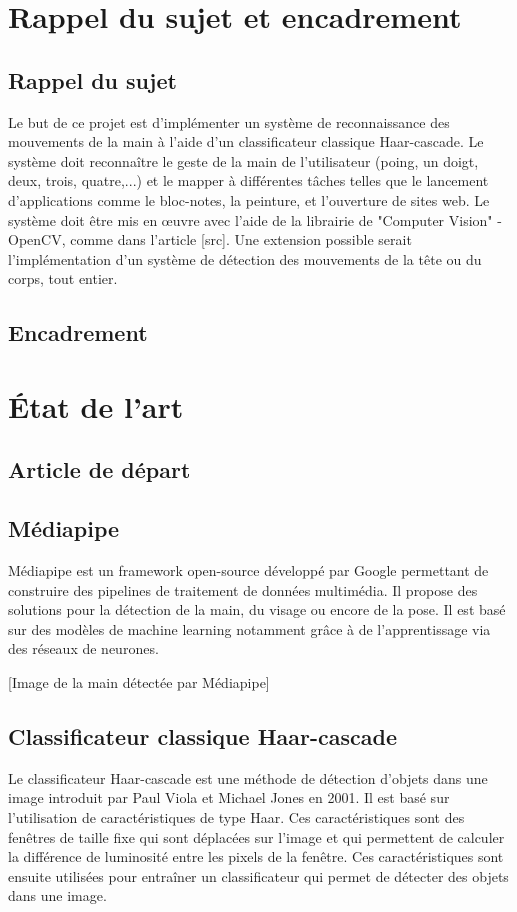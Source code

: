\documentclass[11pt]{article}
\begin{document}
\newpage

\section{Rappel du sujet et encadrement}
\subsection{Rappel du sujet}

Le but de ce projet est d’implémenter un système de reconnaissance des mouvements de la
main à l’aide d’un classificateur classique Haar-cascade. Le système doit reconnaître le geste de
la main de l’utilisateur (poing, un doigt, deux, trois, quatre,...) et le mapper à différentes tâches
telles que le lancement d’applications comme le bloc-notes, la peinture, et l’ouverture de sites web.
Le système doit être mis en œuvre avec l’aide de la librairie de "Computer Vision" - OpenCV,
comme dans l’article [src]. Une extension possible serait l’implémentation d’un système de détection
des mouvements de la tête ou du corps, tout entier.

\subsection{Encadrement}

\newpage

\section{\'Etat de l'art}
\subsection{Article de départ}
\subsection{Médiapipe}
Médiapipe est un framework open-source développé par Google permettant de construire des pipelines de traitement de données multimédia. Il propose des solutions pour la détection de la main, du visage ou encore de la pose. Il est basé sur des modèles de machine learning notamment grâce à de l'apprentissage via des réseaux de neurones. \bigbreak

[Image de la main détectée par Médiapipe]


\subsection{Classificateur classique Haar-cascade}
Le classificateur Haar-cascade est une méthode de détection d'objets dans une image introduit par Paul Viola et Michael Jones en 2001. Il est basé sur l'utilisation de caractéristiques de type Haar. Ces caractéristiques sont des fenêtres de taille fixe qui sont déplacées sur l'image et qui permettent de calculer la différence de luminosité entre les pixels de la fenêtre. Ces caractéristiques sont ensuite utilisées pour entraîner un classificateur qui permet de détecter des objets dans une image. \bigbreak
\end{document}
